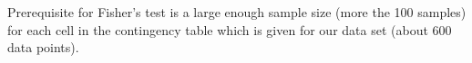   Prerequisite for Fisher's test is a large enough sample size (more the 100 samples) for each cell in the contingency table which is given for our data set (about 600 data points).
  
   
%   
%   
%   
%   
%   
